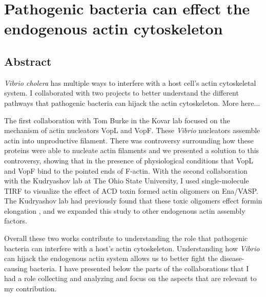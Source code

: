 \chapter{Pathogenic bacteria can effect the endogenous actin cytoskeleton}\label{ch:vibrio}

\section[Abstract]{Abstract\footnotemark}
\textit{Vibrio cholera} has multiple ways to interfere with a host cell’s actin cytoskeletal system. I collaborated with two projects to better understand the different pathways that pathogenic bacteria can hijack the actin cytoskeleton. More here...

The first collaboration with Tom Burke in the Kovar lab focused on the mechanism of actin nucleators VopL and VopF. These \textit{Vibrio} nucleators assemble actin into unproductive filament. There was controversy surrounding how these proteins were able to nucleate actin filaments and we presented a solution to this controversy, showing that in the presence of physiological conditions that VopL and VopF bind to the pointed ends of F-actin. With the second collaboration with the Kudryashov lab at The Ohio State University, I used single-molecule TIRF to visualize the effect of ACD toxin formed actin oligomers on Ena/VASP. The Kudryashov lab had previously found that these toxic oligomers effect formin elongation \citep{heisler_acd_2015}, and we expanded this study to other endogenous actin assembly factors. 

Overall these two works contribute to understanding the role that pathogenic bacteria can interfere with a host's actin cytoskeleton. Understanding how \textit{Vibrio} can hijack the endogenous actin system allows us to better fight the disease-causing bacteria. I have presented below the parts of the collaborations that I had a role collecting and analyzing and focus on the aspects that are relevant to my contribution. 


